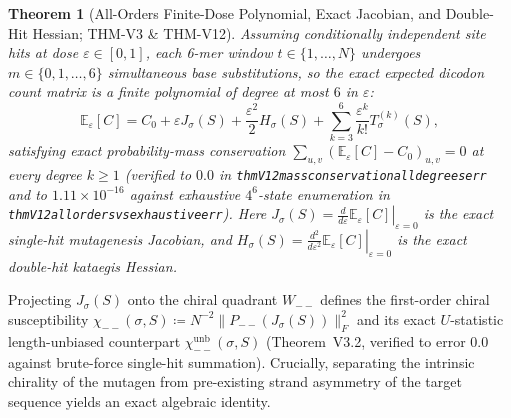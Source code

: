 \documentclass[11pt, a4paper]{article}
\newtheorem{theorem}{Theorem}[section]
\DeclareRobustCommand{\_}{\textunderscore\allowbreak}
\begin{document}
\begin{theorem}[All-Orders Finite-Dose Polynomial, Exact Jacobian, and Double-Hit Hessian; THM-V3 \& THM-V12]
\label{thm:mutagenesis_poly}
Assuming conditionally independent site hits at dose $\varepsilon \in [0, 1]$, each 6-mer window $t \in \{1, \dots, N\}$ undergoes $m \in \{0, 1, \dots, 6\}$ simultaneous base substitutions, so the exact expected dicodon count matrix is a finite polynomial of degree at most $6$ in $\varepsilon$:
\begin{equation}
    \mathbb{E}_{\varepsilon}[C] = C_0 + \varepsilon J_\sigma(S) + \frac{\varepsilon^2}{2} H_\sigma(S) + \sum_{k=3}^{6} \frac{\varepsilon^k}{k!} T_\sigma^{(k)}(S),
\end{equation}
satisfying exact probability-mass conservation $\sum_{u,v} (\mathbb{E}_{\varepsilon}[C] - C_0)_{u,v} = 0$ at every degree $k \ge 1$ (verified to $0.0$ in \texttt{thmV12\_mass\_conservation\_all\_degrees\_err} and to $1.11 \times 10^{-16}$ against exhaustive $4^6$-state enumeration in \texttt{thmV12\_all\_orders\_vs\_exhaustive\_err}). Here $J_\sigma(S) = \left.\frac{d}{d\varepsilon}\mathbb{E}_{\varepsilon}[C]\right|_{\varepsilon=0}$ is the exact single-hit mutagenesis Jacobian, and $H_\sigma(S) = \left.\frac{d^2}{d\varepsilon^2}\mathbb{E}_{\varepsilon}[C]\right|_{\varepsilon=0}$ is the exact double-hit kataegis Hessian.
\end{theorem}

Projecting $J_\sigma(S)$ onto the chiral quadrant $W_{--}$ defines the first-order chiral susceptibility $\chi_{--}(\sigma, S) \coloneqq N^{-2} \|P_{--}(J_\sigma(S))\|_F^2$ and its exact $U$-statistic length-unbiased counterpart $\chi_{--}^{\mathrm{unb}}(\sigma, S)$ (Theorem~V3.2, verified to error $0.0$ against brute-force single-hit summation). Crucially, separating the intrinsic chirality of the mutagen from pre-existing strand asymmetry of the target sequence yields an exact algebraic identity.
\end{document}
